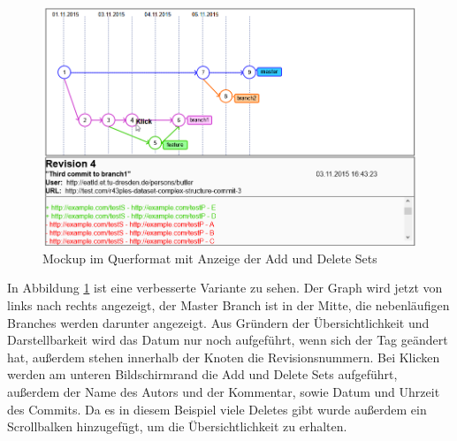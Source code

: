 \documentclass[nocolor]{tudbook}
\begin{document}
\begin{figure}
	\includegraphics[width=\textwidth]{Mockup_Querformat.png}
	\caption{Mockup im Querformat mit Anzeige der Add und Delete Sets}
	\label{fig:mockup2}
\end{figure}

In Abbildung \ref{fig:mockup2} ist eine verbesserte Variante zu sehen. Der Graph wird jetzt von links nach rechts angezeigt, der Master Branch ist in der Mitte, die nebenläufigen Branches werden darunter angezeigt. Aus Gründern der Übersichtlichkeit und Darstellbarkeit wird das Datum nur noch aufgeführt, wenn sich der Tag geändert hat, außerdem stehen innerhalb der Knoten die Revisionsnummern. Bei Klicken werden am unteren Bildschirmrand die Add und Delete Sets aufgeführt, außerdem der Name des Autors und der Kommentar, sowie Datum und Uhrzeit des Commits. Da es in diesem Beispiel viele Deletes gibt wurde außerdem ein Scrollbalken hinzugefügt, um die Übersichtlichkeit zu erhalten.




\listoffigures
\end{document}
